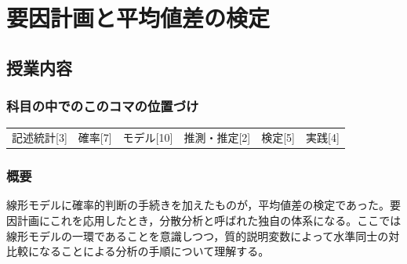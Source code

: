 \section{要因計画と平均値差の検定}
\label{s21_anova}

\subsection{授業内容}
\subsubsection{科目の中でのこのコマの位置づけ}
\begin{tabular}[t]{cccccc}
	記述統計[3] & 確率[7] & モデル[10] & 推測・推定[2] & 検定[5] & 実践[4]
\end{tabular}

\subsubsection{概要}
線形モデルに確率的判断の手続きを加えたものが，平均値差の検定であった。要因計画にこれを応用したとき，分散分析と呼ばれた独自の体系になる。ここでは線形モデルの一環であることを意識しつつ，質的説明変数によって水準同士の対比較になることによる分析の手順について理解する。
